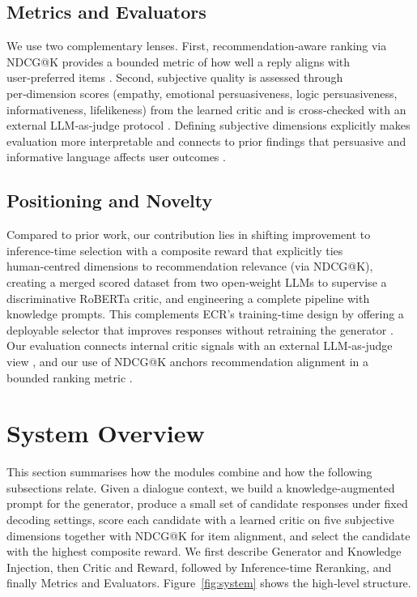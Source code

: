 \documentclass[12pt]{article}
\begin{document}
  \subsection{Metrics and Evaluators}
  We use two complementary lenses. First, recommendation‑aware ranking via NDCG@K provides a bounded metric of how well a reply aligns with user‑preferred items \citep{evidently_ndcg}. Second, subjective quality is assessed through per‑dimension scores (empathy, emotional persuasiveness, logic persuasiveness, informativeness, lifelikeness) from the learned critic and is cross‑checked with an external LLM‑as‑judge protocol \citep{yan2023llmjudge,evidently_llm_judge}. Defining subjective dimensions explicitly makes evaluation more interpretable and connects to prior findings that persuasive and informative language affects user outcomes \citep{li2020empdg,anthropic_persuasion}.
  
  \subsection{Positioning and Novelty}
  Compared to prior work, our contribution lies in shifting improvement to inference‑time selection with a composite reward that explicitly ties human‑centred dimensions to recommendation relevance (via NDCG@K), creating a merged scored dataset from two open‑weight LLMs to supervise a discriminative RoBERTa critic, and engineering a complete pipeline with knowledge prompts. This complements ECR's training‑time design by offering a deployable selector that improves responses without retraining the generator \citep{zhang2024ecr,meta2023llama2,mistral2023}. Our evaluation connects internal critic signals with an external LLM‑as‑judge view \citep{yan2023llmjudge}, and our use of NDCG@K anchors recommendation alignment in a bounded ranking metric \citep{evidently_ndcg}.
  
  \section{System Overview}
  This section summarises how the modules combine and how the following subsections relate. Given a dialogue context, we build a knowledge‑augmented prompt for the generator, produce a small set of candidate responses under fixed decoding settings, score each candidate with a learned critic on five subjective dimensions together with NDCG@K for item alignment, and select the candidate with the highest composite reward. We first describe Generator and Knowledge Injection, then Critic and Reward, followed by Inference‑time Reranking, and finally Metrics and Evaluators. Figure~\ref{fig:system} shows the high‑level structure.
\end{document}
